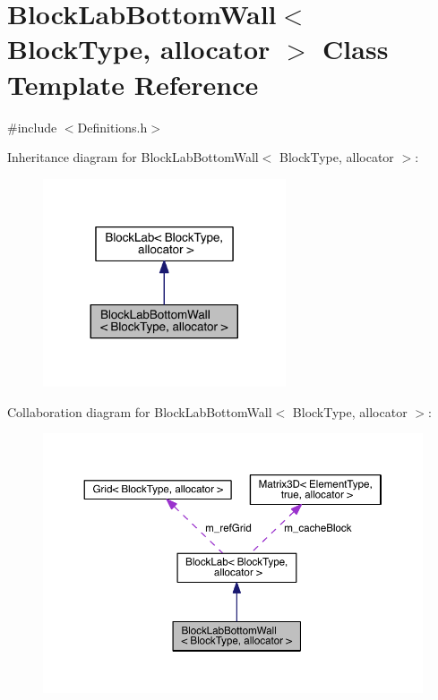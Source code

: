 \hypertarget{class_block_lab_bottom_wall}{}\section{Block\+Lab\+Bottom\+Wall$<$ Block\+Type, allocator $>$ Class Template Reference}
\label{class_block_lab_bottom_wall}


{\ttfamily \#include $<$Definitions.\+h$>$}



Inheritance diagram for Block\+Lab\+Bottom\+Wall$<$ Block\+Type, allocator $>$\+:\nopagebreak
\begin{figure}[H]
\begin{center}
\leavevmode
\includegraphics[width=203pt]{df/d16/class_block_lab_bottom_wall__inherit__graph}
\end{center}
\end{figure}


Collaboration diagram for Block\+Lab\+Bottom\+Wall$<$ Block\+Type, allocator $>$\+:\nopagebreak
\begin{figure}[H]
\begin{center}
\leavevmode
\includegraphics[width=350pt]{d7/dc5/class_block_lab_bottom_wall__coll__graph}
\end{center}
\end{figure}
